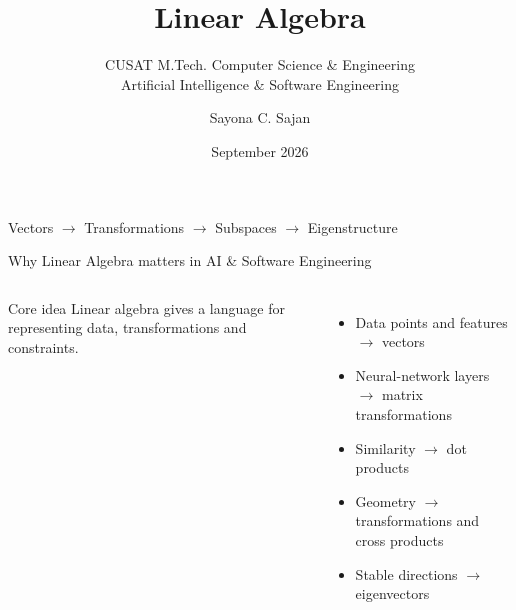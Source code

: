 \documentclass[aspectratio=169,11pt]{beamer}
\title{\textbf{Linear Algebra}}
\subtitle{CUSAT M.Tech. Computer Science \& Engineering\\Artificial Intelligence \& Software Engineering}
\author{Sayona C. Sajan}
\institute{Cochin University of Science and Technology}
\date{September 2026}
\begin{document}
\begin{frame}
  \titlepage
  \vspace{-0.4cm}
  \begin{center}
    \small\color{gray}
    Vectors $\rightarrow$ Transformations $\rightarrow$ Subspaces $\rightarrow$
    Eigenstructure
  \end{center}
\end{frame}

\begin{frame}{Why Linear Algebra matters in AI \& Software Engineering}
\begin{columns}[T]
\begin{block}{Core idea}
Linear algebra gives a language for representing data, transformations and constraints.
\end{block}
\begin{itemize}
\item Data points and features $\rightarrow$ vectors
\item Neural-network layers $\rightarrow$ matrix transformations
\item Similarity $\rightarrow$ dot products
\item Geometry $\rightarrow$ transformations and cross products
\item Stable directions $\rightarrow$ eigenvectors
\end{itemize}

\end{columns}
\end{frame}



\end{document}

